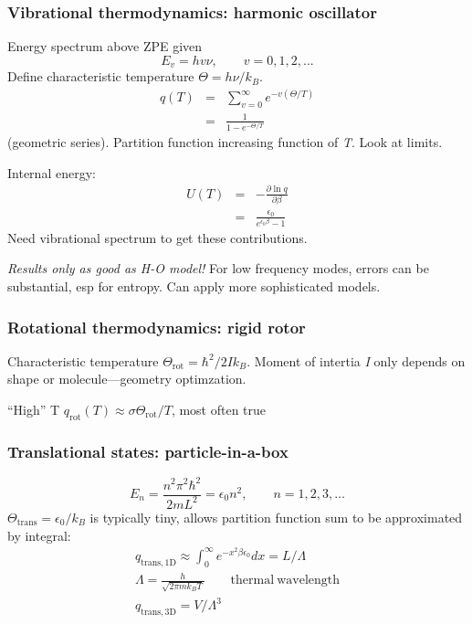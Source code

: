 \documentclass[11pt]{article}
\begin{document}
\subsubsection{Vibrational thermodynamics: harmonic oscillator}
\label{sec:orgdd401c1}
Energy spectrum above ZPE given
\begin{equation}
  E_v=hv\nu,\qquad v=0,1,2,...
\end{equation}
Define characteristic temperature \(\Theta =h \nu/k_B\).
\begin{eqnarray}
q(T) & = &\sum_{v=0}^\infty e^{-v(\Theta/T)} \\
 & = & \frac{1}{1-e^{-\Theta/T}}
\end{eqnarray}
(geometric series). Partition function increasing function of \emph{T}.  Look at limits.

\noindent Internal energy:
\begin{eqnarray}
  U(T) &=&-\frac{\partial \ln q}{\partial \beta}\\
   & = & \frac{\epsilon_0}{e^{\epsilon_0\beta}-1}
\end{eqnarray}
Need vibrational spectrum to get these contributions.

\emph{Results only as good as H-O model!} For low frequency modes, errors can be substantial, esp for entropy.  Can apply more sophisticated models.

\subsubsection{Rotational thermodynamics: rigid  rotor}
\label{sec:orgbdecc99}
Characteristic temperature \(\Theta_\mathrm{rot} = \hbar^2/2 I k_B\).  Moment of intertia \emph{I} only depends on shape or molecule---geometry optimzation. 

``High'' T \(q_\mathrm{rot}(T) \approx \sigma \Theta_\mathrm{rot}/T\), most often true
\subsubsection{Translational states: particle-in-a-box}
\label{sec:orgc169330}
\[
  E_n=\frac{n^2\pi^2\hbar^2}{2 m L^2} = \epsilon_0n^2,\qquad n=1,2,3,\ldots
\]
\(\Theta_\mathrm{trans} = \epsilon_0/k_B\) is typically tiny, allows partition function sum to be approximated by integral:
\begin{eqnarray*}
q_\mathrm{trans,1D} \approx \int_0^\infty e^{-x^2\beta\epsilon_0}dx =
             L/\Lambda \\
             \Lambda = \frac{h}{\sqrt{2\pi m k_B T}} \qquad
             \mathrm{thermal\ wavelength} \\
             q_\mathrm{trans,3D} = V/\Lambda^3
           \end{eqnarray*}
\end{document}
